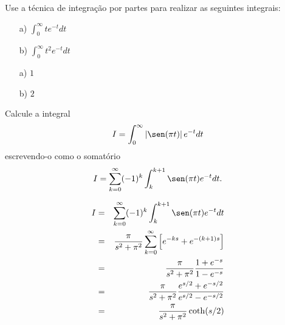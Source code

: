 \begin{exer} Use a técnica de integração por partes para realizar as seguintes integrais:
\begin{itemize}
\item[a)]$\int_0^\infty t e^{-t}dt$
\item[b)]$\int_0^\infty t^2 e^{-t} dt$
\end{itemize}
\end{exer}

\begin{resp}
\begin{itemize}
  \item[a)]$1$
  \item[b)]$2$
  \end{itemize}
\end{resp}


\begin{exer} Calcule a integral
\begin{equation}I=\int_0^\infty \left|\sen(\pi t)\right| e^{-t}dt
 \end{equation}
escrevendo-o como o somatório
\begin{equation}I=\sum_{k=0}^\infty(-1)^k\int_{k}^{k+1} \sen(\pi t) e^{-t}dt.
\end{equation}
\end{exer}

\begin{resp}
\begin{eqnarray*}
I&=&\sum_{k=0}^\infty(-1)^k\int_{k}^{k+1} \sen(\pi t) e^{-t}dt\\
&=&\frac{\pi}{s^2+\pi^2}\sum_{k=0}^\infty\left[e^{-ks}+e^{-(k+1)s}\right]\\
&=&\frac{\pi}{s^2+\pi^2}\frac{1+e^{-s}}{1-e^{-s}}\\
&=&\frac{\pi}{s^2+\pi^2}\frac{e^{s/2}+e^{-s/2}}{e^{s/2}-e^{-s/2}}\\
&=&\frac{\pi}{s^2+\pi^2}\coth(s/2)\\
\end{eqnarray*}

\end{resp}


%